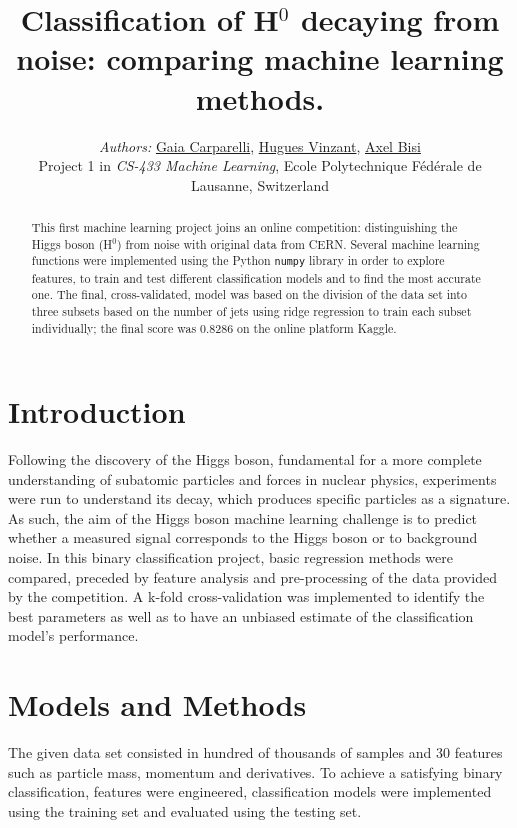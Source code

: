 \documentclass[10pt,conference,compsocconf]{IEEEtran}
\begin{document}
\title{Classification of H$^0$ decaying from noise: comparing machine learning methods.}

\author{
 \textit{Authors:} \href{mailto:gaia.carparelli@epfl.ch}{Gaia Carparelli}, \href{mailto:hugues.vinzant@epfl.ch}{Hugues Vinzant}, \href{mailto:axel.bisi@epfl.ch}{Axel Bisi}  \\
 Project 1 in \textit{CS-433 Machine Learning}, Ecole Polytechnique F\'{e}d\'{e}rale de Lausanne, Switzerland
}

\maketitle

\begin{abstract}
This first machine learning project joins an online competition: distinguishing the Higgs boson (H$^0$) from noise with original data from CERN. Several machine learning functions were implemented using the Python \verb|numpy| library in order to explore features, to train and test different classification models and to find the most accurate one. The final, cross-validated, model was based on the division of the data set into three subsets based on the number of jets using ridge regression to train each subset individually; the final score was 0.8286 on the online platform Kaggle.
\end{abstract}

\section{Introduction}

Following the discovery of the Higgs boson, fundamental for a more complete understanding of subatomic particles and forces in nuclear physics, experiments were run to understand its decay, which produces specific particles as a signature. As such, the aim of the Higgs boson machine learning challenge is to predict whether a measured signal corresponds to the Higgs boson or to background noise. In this binary classification project, basic regression methods were compared, preceded by feature analysis and pre-processing of the data provided by the competition. A k-fold cross-validation was implemented to identify the best parameters as well as to have an unbiased estimate of the classification model's performance.

\section{Models and Methods}
\label{sec:methods}
The given data set consisted in hundred of thousands of samples and 30 features such as particle mass, momentum and derivatives. To achieve a satisfying binary classification, features were engineered, classification models were implemented using the training set and evaluated using the testing set.
\end{document}
